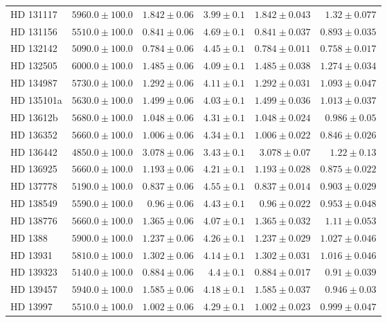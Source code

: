 \begin{longtable*}{lrrrrr}
HD 131117 & $5960.0\pm 100.0$ & $1.842\pm 0.06$ & $3.99\pm 0.1$ & $1.842\pm 0.043$ & $1.32\pm 0.077$ \\ 
HD 131156 & $5510.0\pm 100.0$ & $0.841\pm 0.06$ & $4.69\pm 0.1$ & $0.841\pm 0.037$ & $0.893\pm 0.035$ \\ 
HD 132142 & $5090.0\pm 100.0$ & $0.784\pm 0.06$ & $4.45\pm 0.1$ & $0.784\pm 0.011$ & $0.758\pm 0.017$ \\ 
HD 132505 & $6000.0\pm 100.0$ & $1.485\pm 0.06$ & $4.09\pm 0.1$ & $1.485\pm 0.038$ & $1.274\pm 0.034$ \\ 
HD 134987 & $5730.0\pm 100.0$ & $1.292\pm 0.06$ & $4.11\pm 0.1$ & $1.292\pm 0.031$ & $1.093\pm 0.047$ \\ 
HD 135101a & $5630.0\pm 100.0$ & $1.499\pm 0.06$ & $4.03\pm 0.1$ & $1.499\pm 0.036$ & $1.013\pm 0.037$ \\ 
HD 13612b & $5680.0\pm 100.0$ & $1.048\pm 0.06$ & $4.31\pm 0.1$ & $1.048\pm 0.024$ & $0.986\pm 0.05$ \\ 
HD 136352 & $5660.0\pm 100.0$ & $1.006\pm 0.06$ & $4.34\pm 0.1$ & $1.006\pm 0.022$ & $0.846\pm 0.026$ \\ 
HD 136442 & $4850.0\pm 100.0$ & $3.078\pm 0.06$ & $3.43\pm 0.1$ & $3.078\pm 0.07$ & $1.22\pm 0.13$ \\ 
HD 136925 & $5660.0\pm 100.0$ & $1.193\pm 0.06$ & $4.21\pm 0.1$ & $1.193\pm 0.028$ & $0.875\pm 0.022$ \\ 
HD 137778 & $5190.0\pm 100.0$ & $0.837\pm 0.06$ & $4.55\pm 0.1$ & $0.837\pm 0.014$ & $0.903\pm 0.029$ \\ 
HD 138549 & $5590.0\pm 100.0$ & $0.96\pm 0.06$ & $4.43\pm 0.1$ & $0.96\pm 0.022$ & $0.953\pm 0.048$ \\ 
HD 138776 & $5660.0\pm 100.0$ & $1.365\pm 0.06$ & $4.07\pm 0.1$ & $1.365\pm 0.032$ & $1.11\pm 0.053$ \\ 
HD 1388 & $5900.0\pm 100.0$ & $1.237\pm 0.06$ & $4.26\pm 0.1$ & $1.237\pm 0.029$ & $1.027\pm 0.046$ \\ 
HD 13931 & $5810.0\pm 100.0$ & $1.302\pm 0.06$ & $4.14\pm 0.1$ & $1.302\pm 0.031$ & $1.016\pm 0.046$ \\ 
HD 139323 & $5140.0\pm 100.0$ & $0.884\pm 0.06$ & $4.4\pm 0.1$ & $0.884\pm 0.017$ & $0.91\pm 0.039$ \\ 
HD 139457 & $5940.0\pm 100.0$ & $1.585\pm 0.06$ & $4.18\pm 0.1$ & $1.585\pm 0.037$ & $0.946\pm 0.03$ \\ 
HD 13997 & $5510.0\pm 100.0$ & $1.002\pm 0.06$ & $4.29\pm 0.1$ & $1.002\pm 0.023$ & $0.999\pm 0.047$ \\ 

\end{longtable*}
